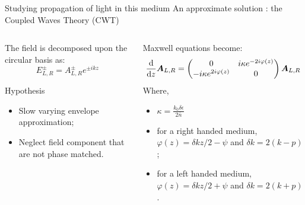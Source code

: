 \documentclass[aspectratio=169]{beamer}
\begin{document}
\begin{frame}{Studying propagation of light in this medium}
	An approximate solution : the Coupled Waves Theory (CWT)
	\begin{columns}
		\begin{column}{0.5\textwidth}
			The field is decomposed upon the circular basis as:
			\begin{equation*}
			E_{L,R}^\pm = A_{L,R}^\pm e^{\pm ikz}
			\end{equation*}
			\begin{block}{Hypothesis}
				\begin{itemize}
					\item Slow varying envelope approximation;
					\item Neglect field component that are not phase matched.
				\end{itemize}
			\end{block}
		\end{column}
		\begin{column}{0.5\textwidth}
			Maxwell equations become:
			\begin{equation*}
			\dv{z}\bm{A}_{L,R} = \begin{pmatrix}0 & i\kappa e^{-2i\varphi(z)} \\ -i\kappa e^{2i\varphi(z)} & 0\end{pmatrix}\bm{A}_{L,R}
			\end{equation*}
			Where,
			\begin{itemize}
				\item $\kappa = \frac{k_0\delta\epsilon}{2\bar{n}}$
				\item for a right handed medium, $\varphi(z) = \delta kz / 2 - \psi$ and $\delta k = 2(k-p)$;
				\item for a left handed medium, $\varphi(z) = \delta kz / 2 + \psi$ and $\delta k = 2(k+p)$.
			\end{itemize}
		\end{column}
	\end{columns}
\end{frame}
\end{document}
